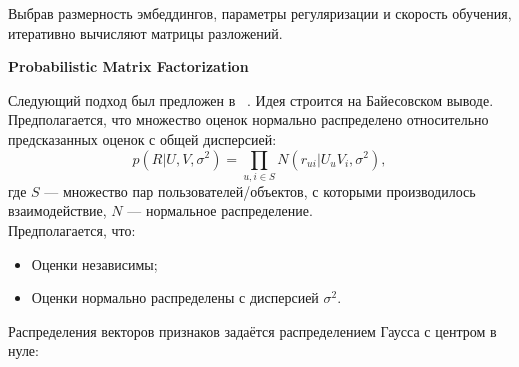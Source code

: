 Выбрав размерность эмбеддингов, параметры регуляризации и скорость обучения, итеративно вычисляют матрицы разложений.

\vspace{1em}
\textbf{Probabilistic Matrix Factorization}

Следующий подход был предложен в ~\cite{pmf}.
Идея строится на Байесовском выводе.
Предполагается, что множество оценок нормально распределено относительно предсказанных оценок с общей дисперсией:
\begin{equation}\label{eq:ratings-distr}
        p(R|U, V, \sigma^2) = \prod_{u, i \in S}{N(r_{ui}|U_{u}V_{i}, \sigma^2)},
\end{equation}
где $S$ --- множество пар пользователей/объектов, с которыми производилось взаимодействие,
$N$ --- нормальное распределение.\\
Предполагается, что:
\begin{itemize}
\item Оценки независимы;
\item Оценки нормально распределены с дисперсией $\sigma^2$.
\end{itemize}
Распределения векторов признаков задаётся распределением Гаусса с центром в нуле:

